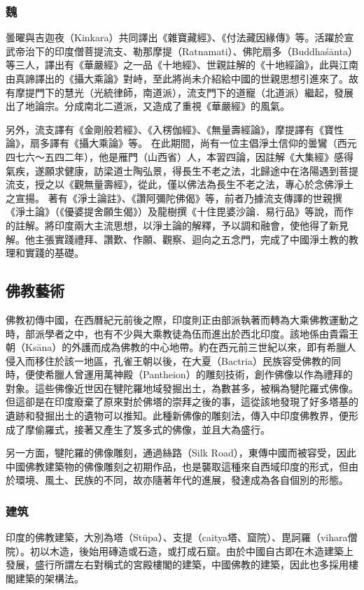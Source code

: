 \subsubsection{魏}
曇曜與吉迦夜（Kinkara）共同譯出《雜寶藏經》、《付法藏因緣傳》等。活躍於宣武帝治下的印度僧菩提流支、勒那摩提（Ratnamati）、佛陀扇多（Buddhaśānta）等三人，譯出有《華嚴經》之一品《十地經》、世親註解的《十地經論》，此與江南由真諦譯出的《攝大乘論》對峙，至此將尚未介紹給中國的世親思想引進來了。故有摩提門下的慧光（光統律師，南道派），流支門下的道寵（北道派）繼起，發展出了地論宗。分成南北二道派，又造成了重視《華嚴經》的風氣。

另外，流支譯有《金剛般若經》、《入楞伽經》、《無量壽經論》，摩提譯有《寶性論》，扇多譯有《攝大乘論》等。
在此期間，尚有一位主倡淨土信仰的曇鸞（西元四七六～五四二年），他是雁門（山西省）人，本習四論，因註解《大集經》感得氣疾，遂願求健康，訪梁道士陶弘景，得長生不老之法，北歸途中在洛陽遇到菩提流支，授之以《觀無量壽經》，從此，僅以佛法為長生不老之法，專心於念佛淨土之宣揚。
著有《淨土論註》、《讚阿彌陀佛偈》等，前者乃據流支傳譯的世親撰《淨土論》（《優婆提舍願生偈》）及龍樹撰《十住毘婆沙論．易行品》等說，而作的註解。將印度兩大主流思想，以淨土論的解釋，予以調和融會，使他得了新見解。他主張實踐禮拜、讚歎、作願、觀察、迴向之五念門，完成了中國淨土教的教理和實踐的基礎。

\subsection{佛教藝術}
佛教初傳中國，在西曆紀元前後之際，印度則正由部派執著而轉為大乘佛教運動之時，部派學者之中，也有不少與大乘教徒為伍而進出於西北印度。該地係由貴霜王朝（Ksāna）的外護而成為佛教的中心地帶。約在西元前三世紀以來，即有希臘人侵入而移住於該一地區，孔雀王朝以後，在大夏（Bactria）民族容受佛教的同時，便使希臘人曾運用萬神殿（Pantheion）的雕刻技術，創作佛像以作為禮拜的對象。這些佛像近世因在犍陀羅地域發掘出土，為數甚多，被稱為犍陀羅式佛像。但這卻是在印度廢棄了原來對於佛塔的崇拜之後的事，這從該地發現了好多塔基的遺跡和發掘出土的遺物可以推知。此種新佛像的雕刻法，傳入中印度佛教界，便形成了摩偷羅式，接著又產生了笈多式的佛像，並且大為盛行。

另一方面，犍陀羅的佛像雕刻，通過絲路（Silk Road），東傳中國而被容受，因此中國佛教建築物的佛像雕刻之初期作品，也是襲取這種來自西域印度的形式，但由於環境、風土、民族的不同，故亦隨著年代的進展，發達成為各自個別的形態。
\subsubsection{建筑}
印度的佛教建築，大別為塔（Stūpa）、支提（caitya塔、窟院）、毘訶羅（vihara僧院）。初以木造，後始用磚造或石造，或打成石窟。由於中國自古即在木造建築上發展，盛行所謂左右對稱式的宮殿樓閣的建築，中國佛教的建築，因此也多採用樓閣建築的架構法。
